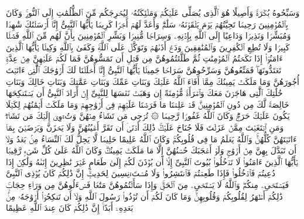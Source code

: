 \stopbuffer%
\startbuffer[\q:33:42]
وَسَبِّحُوهُ بُكۡرَةࣰ وَأَصِیلًا%
\stopbuffer%
\startbuffer[\q:33:43]
هُوَ ٱلَّذِی یُصَلِّی عَلَیۡكُمۡ وَمَلَٰۤئِكَتُهُۥ لِیُخۡرِجَكُم مِّنَ ٱلظُّلُمَٰتِ إِلَى ٱلنُّورِۚ وَكَانَ بِٱلۡمُؤۡمِنِینَ رَحِیمࣰا%
\stopbuffer%
\startbuffer[\q:33:44]
تَحِیَّتُهُمۡ یَوۡمَ یَلۡقَوۡنَهُۥ سَلَٰمࣱۚ وَأَعَدَّ لَهُمۡ أَجۡرࣰا كَرِیمࣰا%
\stopbuffer%
\startbuffer[\q:33:45]
یَٰۤأَیُّهَا ٱلنَّبِیُّ إِنَّاۤ أَرۡسَلۡنَٰكَ شَٰهِدࣰا وَمُبَشِّرࣰا وَنَذِیرࣰا%
\stopbuffer%
\startbuffer[\q:33:46]
وَدَاعِیًا إِلَى ٱللَّهِ بِإِذۡنِهِۦ وَسِرَاجࣰا مُّنِیرࣰا%
\stopbuffer%
\startbuffer[\q:33:47]
وَبَشِّرِ ٱلۡمُؤۡمِنِینَ بِأَنَّ لَهُم مِّنَ ٱللَّهِ فَضۡلࣰا كَبِیرࣰا%
\stopbuffer%
\startbuffer[\q:33:48]
وَلَا تُطِعِ ٱلۡكَٰفِرِینَ وَٱلۡمُنَٰفِقِینَ وَدَعۡ أَذَىٰهُمۡ وَتَوَكَّلۡ عَلَى ٱللَّهِۚ وَكَفَىٰ بِٱللَّهِ وَكِیلࣰا%
\stopbuffer%
\startbuffer[\q:33:49]
یَٰۤأَیُّهَا ٱلَّذِینَ ءَامَنُوۤا۟ إِذَا نَكَحۡتُمُ ٱلۡمُؤۡمِنَٰتِ ثُمَّ طَلَّقۡتُمُوهُنَّ مِن قَبۡلِ أَن تَمَسُّوهُنَّ فَمَا لَكُمۡ عَلَیۡهِنَّ مِنۡ عِدَّةࣲ تَعۡتَدُّونَهَاۖ فَمَتِّعُوهُنَّ وَسَرِّحُوهُنَّ سَرَاحࣰا جَمِیلࣰا%
\stopbuffer%
\startbuffer[\q:33:50]
یَٰۤأَیُّهَا ٱلنَّبِیُّ إِنَّاۤ أَحۡلَلۡنَا لَكَ أَزۡوَٰجَكَ ٱلَّٰتِیۤ ءَاتَیۡتَ أُجُورَهُنَّ وَمَا مَلَكَتۡ یَمِینُكَ مِمَّاۤ أَفَاۤءَ ٱللَّهُ عَلَیۡكَ وَبَنَاتِ عَمِّكَ وَبَنَاتِ عَمَّٰتِكَ وَبَنَاتِ خَالِكَ وَبَنَاتِ خَٰلَٰتِكَ ٱلَّٰتِی هَاجَرۡنَ مَعَكَ وَٱمۡرَأَةࣰ مُّؤۡمِنَةً إِن وَهَبَتۡ نَفۡسَهَا لِلنَّبِیِّ إِنۡ أَرَادَ ٱلنَّبِیُّ أَن یَسۡتَنكِحَهَا خَالِصَةࣰ لَّكَ مِن دُونِ ٱلۡمُؤۡمِنِینَۗ قَدۡ عَلِمۡنَا مَا فَرَضۡنَا عَلَیۡهِمۡ فِیۤ أَزۡوَٰجِهِمۡ وَمَا مَلَكَتۡ أَیۡمَٰنُهُمۡ لِكَیۡلَا یَكُونَ عَلَیۡكَ حَرَجࣱۗ وَكَانَ ٱللَّهُ غَفُورࣰا رَّحِیمࣰا%
\stopbuffer%
\startbuffer[\q:33:51]
۞ تُرۡجِی مَن تَشَاۤءُ مِنۡهُنَّ وَتُءۡوِیۤ إِلَیۡكَ مَن تَشَاۤءُۖ وَمَنِ ٱبۡتَغَیۡتَ مِمَّنۡ عَزَلۡتَ فَلَا جُنَاحَ عَلَیۡكَۚ ذَٰلِكَ أَدۡنَىٰۤ أَن تَقَرَّ أَعۡیُنُهُنَّ وَلَا یَحۡزَنَّ وَیَرۡضَیۡنَ بِمَاۤ ءَاتَیۡتَهُنَّ كُلُّهُنَّۚ وَٱللَّهُ یَعۡلَمُ مَا فِی قُلُوبِكُمۡۚ وَكَانَ ٱللَّهُ عَلِیمًا حَلِیمࣰا%
\stopbuffer%
\startbuffer[\q:33:52]
لَّا یَحِلُّ لَكَ ٱلنِّسَاۤءُ مِنۢ بَعۡدُ وَلَاۤ أَن تَبَدَّلَ بِهِنَّ مِنۡ أَزۡوَٰجࣲ وَلَوۡ أَعۡجَبَكَ حُسۡنُهُنَّ إِلَّا مَا مَلَكَتۡ یَمِینُكَۗ وَكَانَ ٱللَّهُ عَلَىٰ كُلِّ شَیۡءࣲ رَّقِیبࣰا%
\stopbuffer%
\startbuffer[\q:33:53]
یَٰۤأَیُّهَا ٱلَّذِینَ ءَامَنُوا۟ لَا تَدۡخُلُوا۟ بُیُوتَ ٱلنَّبِیِّ إِلَّاۤ أَن یُؤۡذَنَ لَكُمۡ إِلَىٰ طَعَامٍ غَیۡرَ نَٰظِرِینَ إِنَىٰهُ وَلَٰكِنۡ إِذَا دُعِیتُمۡ فَٱدۡخُلُوا۟ فَإِذَا طَعِمۡتُمۡ فَٱنتَشِرُوا۟ وَلَا مُسۡتَءۡنِسِینَ لِحَدِیثٍۚ إِنَّ ذَٰلِكُمۡ كَانَ یُؤۡذِی ٱلنَّبِیَّ فَیَسۡتَحۡیِۦ مِنكُمۡۖ وَٱللَّهُ لَا یَسۡتَحۡیِۦ مِنَ ٱلۡحَقِّۚ وَإِذَا سَأَلۡتُمُوهُنَّ مَتَٰعࣰا فَسۡءَلُوهُنَّ مِن وَرَاۤءِ حِجَابࣲۚ ذَٰلِكُمۡ أَطۡهَرُ لِقُلُوبِكُمۡ وَقُلُوبِهِنَّۚ وَمَا كَانَ لَكُمۡ أَن تُؤۡذُوا۟ رَسُولَ ٱللَّهِ وَلَاۤ أَن تَنكِحُوۤا۟ أَزۡوَٰجَهُۥ مِنۢ بَعۡدِهِۦۤ أَبَدًاۚ إِنَّ ذَٰلِكُمۡ كَانَ عِندَ ٱللَّهِ عَظِیمًا%
